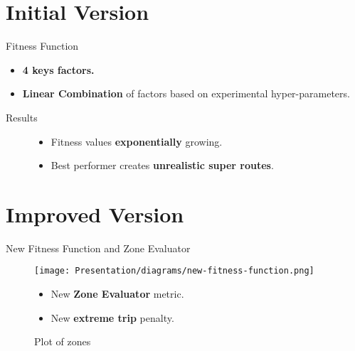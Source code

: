 \documentclass{beamer}
\begin{document}
\section{Initial Version}
\begin{frame}{Fitness Function}
    \begin{center}
    \end{center}
    \begin{itemize}
        \item \textbf{4 keys factors.} 
        \item \textbf{Linear Combination} of factors based on experimental hyper-parameters. 
    \end{itemize}
\end{frame}

\begin{frame}{Results}
\begin{figure}
\begin{itemize}
    \item Fitness values \textbf{exponentially} growing. 
    \item Best performer creates \textbf{unrealistic super routes}. 
\end{itemize}
\end{figure}
\end{frame}

\section{Improved Version}

\begin{frame}{New Fitness Function and Zone Evaluator}
\begin{figure}
%
  \texttt{[image: Presentation/diagrams/new-fitness-function.png]}
  \caption{New Fitness Function}\label{fig:long_route}
\endminipage\hfill
{}
  \caption{Plot of zones}\label{fig:fitness_breakdown}
\endminipage
\begin{itemize}
    \item New \textbf{Zone Evaluator} metric.
    \item New \textbf{extreme trip} penalty. 
\end{itemize}
\end{figure}
\end{frame}
\end{document}
